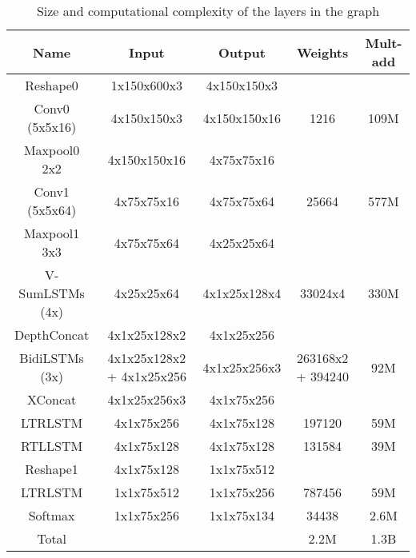 \documentclass[runningheads]{llncs}
\begin{document}
\begin{table}
\begin{center}
\caption{Size and computational complexity of the layers in the graph}
\label{table:net_arch}
{\scriptsize
\begin{tabulary}{\linewidth}{| c | C | c | C | c |}
\hline
Name            & Input         & Output       & Weights      & Mult-add \\ \hline \hline 
Reshape0        & 1x150x600x3   & 4x150x150x3  &              & \\ \hline 
Conv0 (5x5x16)  & 4x150x150x3   & 4x150x150x16 & 1216         & 109M \\ \hline 
Maxpool0 2x2    & 4x150x150x16  & 4x75x75x16   &              & \\ \hline 
Conv1 (5x5x64)  & 4x75x75x16    & 4x75x75x64   & 25664        & 577M \\ \hline 
Maxpool1 3x3    & 4x75x75x64    & 4x25x25x64   &              & \\ \hline 
V-SumLSTMs (4x) & 4x25x25x64    & 4x1x25x128x4 & 33024x4      & 330M \\ \hline 
DepthConcat     & 4x1x25x128x2  & 4x1x25x256   &              & \\ \hline 
BidiLSTMs (3x)  & 4x1x25x128x2 + 4x1x25x256 & 4x1x25x256x3 & 263168x2 + 394240 & 92M \\ \hline 
XConcat         & 4x1x25x256x3  & 4x1x75x256   &              & \\ \hline 
LTRLSTM         & 4x1x75x256    & 4x1x75x128   & 197120       & 59M \\ \hline   
RTLLSTM         & 4x1x75x128    & 4x1x75x128   & 131584       & 39M \\ \hline  
Reshape1        & 4x1x75x128    & 1x1x75x512   &              & \\ \hline 
LTRLSTM         & 1x1x75x512    & 1x1x75x256   & 787456       & 59M \\ \hline 
Softmax         & 1x1x75x256    & 1x1x75x134   & 34438        & 2.6M \\ \hline   
Total           &               &              & 2.2M         & 1.3B \\ \hline 
\end{tabulary}
}
\end{center} 
\end{table}
\end{document}
